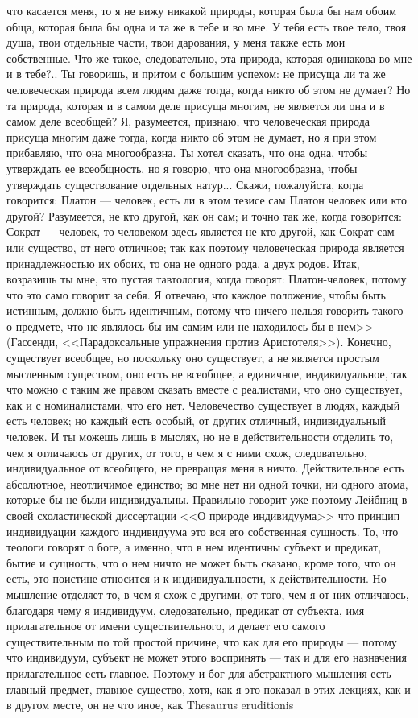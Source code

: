 \documentclass[12pt]{article}
\begin{document}
что касается меня, то я не вижу никакой природы, которая была бы нам обоим обща, которая была бы одна и та же в тебе и во мне. У тебя есть твое тело, твоя душа, твои отдельные части, твои дарования, у меня также есть мои собственные. Что же такое, следовательно, эта природа, которая одинакова во мне и в тебе?.. Ты говоришь, и притом с большим успехом: не присуща ли та же человеческая природа всем людям даже тогда, когда никто об этом не думает? Но та природа, которая и в самом деле присуща многим, не является ли она и в самом деле всеобщей? Я, разумеется, признаю, что человеческая природа присуща многим даже тогда, когда никто об этом не думает, но я при этом прибавляю, что она многообразна. Ты хотел сказать, что она одна, чтобы утверждать ее всеобщность, но я говорю, что она многообразна, чтобы утверждать существование отдельных натур... Скажи, пожалуйста, когда говорится: Платон --- человек, есть ли в этом тезисе сам Платон человек или кто другой? Разумеется, не кто другой, как он сам; и точно так же, когда говорится: Сократ --- человек, то человеком здесь является не кто другой, как Сократ сам или существо, от него отличное; так как поэтому человеческая природа является принадлежностью их обоих, то она не одного рода, а двух родов. Итак, возразишь ты мне, это пустая тавтология, когда говорят: Платон-человек, потому что это само говорит за себя. Я отвечаю, что каждое положение, чтобы быть истинным, должно быть идентичным, потому что ничего нельзя говорить такого о предмете, что не являлось бы им самим или не находилось бы в нем>> (Гассенди, <<Парадоксальные упражнения против Аристотеля>>). Конечно, существует всеобщее, но поскольку оно существует, а не является простым мысленным существом, оно есть не всеобщее, а единичное, индивидуальное, так что можно с таким же правом сказать вместе с реалистами, что оно существует, как и с номиналистами, что его нет. Человечество существует в людях, каждый есть человек; но каждый есть особый, от других отличный, индивидуальный человек. И ты можешь лишь в мыслях, но не в действительности отделить то, чем я отличаюсь от других, от того, в чем я с ними схож, следовательно, индивидуальное от всеобщего, не превращая меня в ничто. Действительное есть абсолютное, неотличимое единство; во мне нет ни одной точки, ни одного атома, которые бы не были индивидуальны. Правильно говорит уже поэтому Лейбниц в своей схоластической диссертации <<О природе индивидуума>>  что принцип индивидуации каждого индивидуума это вся его собственная сущность. То, что теологи говорят о боге, а именно, что в нем идентичны субъект и предикат, бытие и сущность, что о нем ничто не может быть сказано, кроме того, что он есть,-это поистине относится и к индивидуальности, к действительности. Но мышление отделяет то, в чем я схож с другими, от того, чем я от них отличаюсь, благодаря чему я индивидуум, следовательно, предикат от субъекта, имя прилагательное от имени существительного, и делает его самого существительным по той простой причине, что как для его природы --- потому что индивидуум, субъект не может этого воспринять --- так и для его назначения прилагательное есть главное. Поэтому и бог для абстрактного мышления есть главный предмет, главное существо, хотя, как я это показал в этих лекциях, как и в другом месте, он не что иное, как Thesaurus eruditionis 
\end{document}
